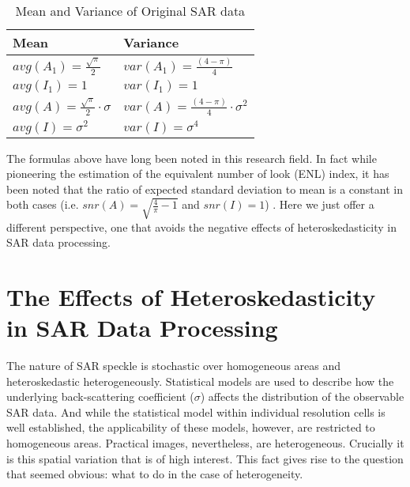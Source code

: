\begin{table}[!h]
\normalsize
\centering
\begin{tabular}{|l|l|}
\hline
Mean & Variance \\
\hline
$avg(A_1) = \frac{ \sqrt{\pi}}{2}$ & $var(A_1) = \frac{(4-\pi)}{4}$ \\
$avg(I_1) = 1$ & $var(I_1) = 1$ \\
$avg(A) = \frac{\sqrt{\pi}}{2} \cdot \sigma $ & $var(A) = \frac{(4-\pi)}{4} \cdot \sigma^2 $ \\
$avg(I) = \sigma^2 $ & $ var(I) = \sigma^4$ \\
\hline
\end{tabular}
\caption{ Mean and Variance of Original SAR data }
\label{tbl:orginal_sar_avg_var}
\end{table}

The formulas above have long been noted in this research field. 
In fact while pioneering the estimation of the equivalent number of look (ENL) index, 
 it has been noted that the ratio of expected standard deviation to mean is a constant in both cases (i.e. $snr(A)=\sqrt{\frac{4}{\pi}-1}$ and $snr(I)=1$) \cite{Lee_1992_IMA_298}.
Here we just offer a different perspective,
  one that avoids the negative effects of heteroskedasticity in SAR data processing.

\section{The Effects of Heteroskedasticity in SAR Data Processing}


The nature of SAR speckle is stochastic over homogeneous areas and heteroskedastic heterogeneously. 
Statistical models are used to describe how the underlying back-scattering coefficient ($\sigma$) affects the distribution of the observable SAR data. 
And while the statistical model within individual resolution cells is well established,
  the applicability of these models, however, are restricted to homogeneous areas. 
Practical images, nevertheless, are heterogeneous. 
Crucially it is this spatial variation that is of high interest. 
This fact gives rise to the question that seemed obvious:
  what to do in the case of heterogeneity.


